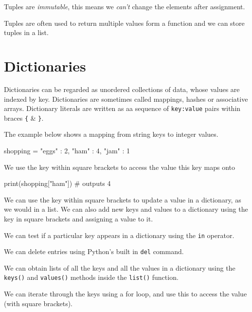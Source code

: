 Tuples are \textit{immutable}, this means we \textit{can't} change the elements after assignment.

Tuples are often used to return multiple values form a function and we can store tuples in a list.

\section*{Dictionaries}
Dictionaries can be regarded as unordered collections of data, whose values are indexed by key. Dictionaries are sometimes called mappings, hashes or associative arrays. Dictionary literals are written as aa sequence of \verb|key:value| pairs within braces \verb|{| \& \verb|}|. 

The example below shows a mapping from string keys to integer values.
\begin{python}
shopping = {"eggs" : 2, "ham" : 4, "jam" : 1}
\end{python}
We use the key within square brackets to access the value this key maps onto
\begin{python}
print(shopping["ham"])  # outputs 4
\end{python}
We can use the key within square brackets to update a value in a dictionary, as we would in a list. We can also add new keys and values to a dictionary using the key in square brackets and assigning a value to it.

We can test if a particular key appears in a dictionary using the \verb|in| operator.

We can delete entries using Python's built in \verb|del| command.

We can obtain lists of all the keys and all the values in a dictionary using the \verb|keys()| and \verb|values()| methods inside the \verb|list()| function.

We can iterate through the keys using a for loop, and use this to access the value (with square brackets).